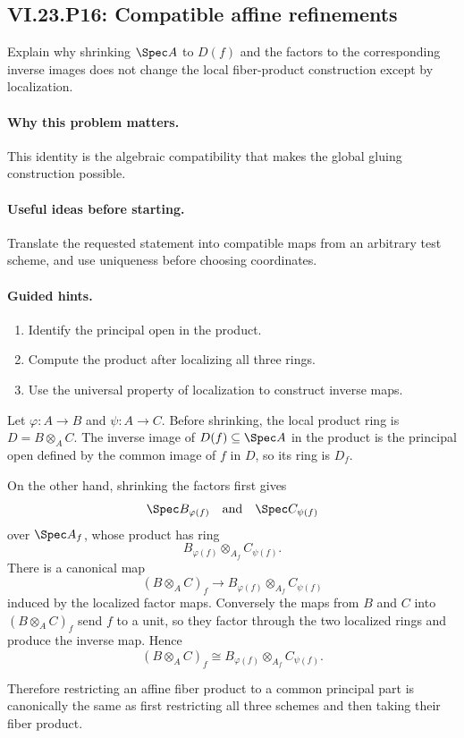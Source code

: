 \subsection*{VI.23.P16: Compatible affine refinements}
\begin{problem}\label{prob:vi23-p16}
Explain why shrinking $\Spec A$ to $D(f)$ and the factors to the corresponding inverse images
does not change the local fiber-product construction except by localization.
\end{problem}

\ifdefined\FullProblemDossiers
\paragraph{Why this problem matters.}
This identity is the algebraic compatibility that makes the global gluing construction possible.

\paragraph{Useful ideas before starting.}
Translate the requested statement into compatible maps from an arbitrary test scheme, and use uniqueness before choosing coordinates.

\paragraph{Guided hints.}
\begin{enumerate}
\item Identify the principal open in the product.
\item Compute the product after localizing all three rings.
\item Use the universal property of localization to construct inverse maps.
\end{enumerate}

\begin{solution}
Let $\varphi:A\to B$ and $\psi:A\to C$.  Before shrinking, the local product ring is
$D=B\otimes_AC$.  The inverse image of $D(f)\subseteq\Spec A$ in the product is the principal
open defined by the common image of $f$ in $D$, so its ring is $D_f$.

On the other hand, shrinking the factors first gives
\[
\Spec B_{\varphi(f)}
\quad\text{and}\quad
\Spec C_{\psi(f)}
\]
over $\Spec A_f$, whose product has ring
\[
B_{\varphi(f)}\otimes_{A_f}C_{\psi(f)}.
\]
There is a canonical map
\[
(B\otimes_AC)_f
\longrightarrow
B_{\varphi(f)}\otimes_{A_f}C_{\psi(f)}
\]
induced by the localized factor maps.  Conversely the maps from $B$ and $C$ into
$(B\otimes_AC)_f$ send $f$ to a unit, so they factor through the two localized rings and produce
the inverse map.  Hence
\[
(B\otimes_AC)_f
\cong
B_{\varphi(f)}\otimes_{A_f}C_{\psi(f)}.
\]

Therefore restricting an affine fiber product to a common principal part is canonically the same
as first restricting all three schemes and then taking their fiber product.
\end{solution}

